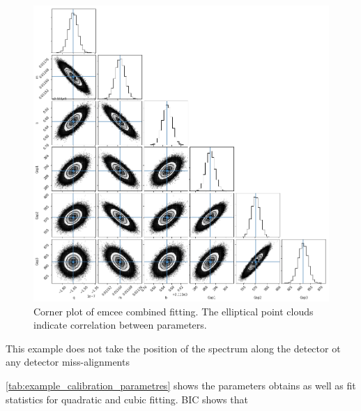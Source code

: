 \begin{figure}
    \centering
    \includegraphics[width=0.5\linewidth]{./figures/appendix/multidetecot_param_fit}
    \caption{Corner plot of emcee combined fitting. The elliptical point clouds indicate correlation between parameters.}
    \label{fig:multidetecotparamfit}
\end{figure}

This example does not take the  position of the spectrum along the detector ot any detector miss-alignments

\cref{tab:example_calibration_parametres} shows the parameters obtains as well as fit statistics for quadratic and cubic fitting. BIC shows that

